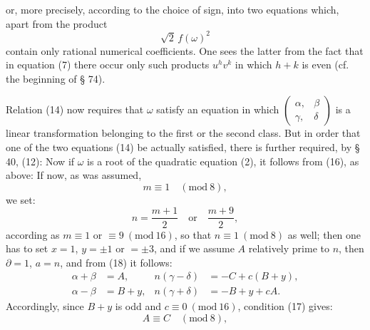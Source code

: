 
or, more precisely, according to the choice of sign, into two equations which, apart from the product
\[
\sqrt{2}\, f(\omega)^2
\]
contain only rational numerical coefficients. One sees the latter from the fact that in equation (7) there occur only such products $u^h v^k$ in which $h+k$ is even (cf. the beginning of § 74).

Relation (14) now requires that $\omega$ satisfy an equation
in which $\begin{pmatrix} \alpha, & \beta \\ \gamma, & \delta \end{pmatrix}$ is a linear transformation belonging to the first or the second class. But in order that one of the two equations (14) be actually satisfied, there is further required, by § 40, (12):
Now if $\omega$ is a root of the quadratic equation (2), it follows from (16), as above:
If now, as was assumed,
\[
m \equiv 1 \quad (\mathrm{mod}\ 8),
\]
we set:
\[
n = \frac{m+1}{2} \quad \text{or} \quad \frac{m+9}{2},
\]
according as $m \equiv 1$ or $\equiv 9\ (\mathrm{mod}\ 16)$, so that $n \equiv 1\ (\mathrm{mod}\ 8)$ as well; then one has to set $x = 1$, $y = \pm 1$ or $= \pm 3$, and if we assume $A$ relatively prime to $n$, then $\partial = 1$, $a = n$, and from (18) it follows: %
\[
\begin{aligned}
\alpha + \beta &= A, & n(\gamma - \delta) &= -C + c(B+y), \\
\alpha - \beta &= B + y, & n(\gamma + \delta) &= -B + y + cA.
\end{aligned}
\]
Accordingly, since $B+y$ is odd and $c \equiv 0\ (\mathrm{mod}\ 16)$, condition (17) gives:
\[
A \equiv C \quad (\mathrm{mod}\ 8),
\]
